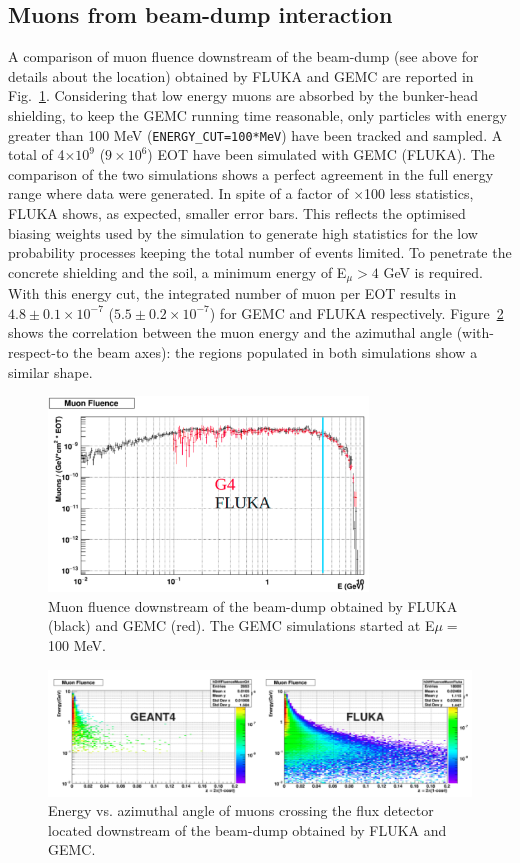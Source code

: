 \subsection{Muons from beam-dump interaction}
A comparison of muon fluence downstream of the beam-dump (see above for details about the location)
obtained by FLUKA and GEMC are reported in Fig.~\ref{fig:mu-flu-bd}. Considering that low energy muons are absorbed by the bunker-head shielding, to keep the GEMC running time reasonable, only particles with energy greater than 100 MeV ({\tt ENERGY\_CUT=100*MeV}) have been tracked and sampled. A total of 4$\times10^9$ ($9\times 10^6$) EOT have been simulated with GEMC (FLUKA). The comparison of the two simulations shows a perfect agreement in the full energy range where data were generated.
In spite of a factor of $\times$100  less statistics, FLUKA shows, as expected, smaller error bars. This reflects the optimised biasing weights used by the simulation to generate high statistics for the low probability processes keeping the total number of events limited.
To penetrate  the concrete shielding and the soil, a minimum energy of  E$_\mu>4$ GeV is required. With this energy cut,   the integrated number of muon per EOT results in $4.8\pm 0.1 \times 10^{-7}$ ($5.5\pm 0.2 \times 10^{-7}$) for GEMC and FLUKA respectively.
Figure~\ref{fig:mu-flu-bd-2d} shows the correlation between the muon energy and the azimuthal angle (with-respect-to the beam axes): the regions  populated in both simulations show a similar shape.

\begin{figure}[h!] 
\center
\includegraphics[width=8.5cm]{figs/mu-flu-bd.pdf}
\caption{Muon fluence downstream of the beam-dump obtained by FLUKA (black) and GEMC (red). The GEMC simulations started at E$\mu=$100 MeV.}
\label{fig:mu-flu-bd}
\end{figure}

\begin{figure}[h!] 
\center
\includegraphics[width=16cm]{figs/mu-flu-bd-2d.pdf} 
\caption{Energy vs. azimuthal angle of muons crossing the flux detector located downstream of the beam-dump obtained by FLUKA  and GEMC.}
\label{fig:mu-flu-bd-2d}
\end{figure}


